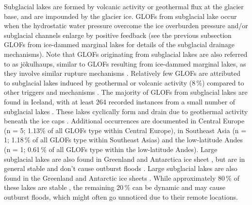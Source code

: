 Subglacial lakes are formed by volcanic activity or geothermal flux at the glacier base, and are impounded by the glacier ice. GLOFs from subglacial lake occur when the hydrostatic water pressure overcome the ice overburden pressure and/or subglacial channels enlarge by positive feedback (see the previous subsection GLOFs from ice-dammed marginal lakes for details of the subglacial drainage mechanisms). Note that GLOFs originating from subglacial lakes are also referred to as jökulhaups, similar to GLOFs resulting from ice-dammed marginal lakes, as they involve similar rupture mechanisms \citep{Bjornsson2010}. Relatively few GLOFs are attributed to subglacial lakes induced by geothermal or volcanic activity (8\,\%) compared to other triggers and mechanisms \citep{Lutzow&al2023}. The majority of GLOFs from subglacial lakes are found in Iceland, with at least 264 recorded instances from a small number of subglacial lakes \citep{Bjornsson2003}. These lakes cyclically form and drain due to geothermal activity beneath the ice caps \citep{Bjornsson&al2001}. Additional occurrences are documented in Central Europe (n = 5; 1.13\% of all GLOFs type within Central Europe), in
Southeast Asia (n = 1; 1.18\,\% of all GLOFs type within Southeast Asias) and the low-latitude Andes (n = 1; 0.61\,\% of all GLOFs type within the low-latitude Andes). Large subglacial lakes are also found in Greenland and Antarctica ice sheet \citep{Livingstone&al2022}, but are in general stable and don't cause outburst floods \citep{Siegert&al2016,Bowling&al2019}. Large subglacial lakes are also found in the Greenland and Antarctic ice sheets \citep{Siegert&al2016, Bowling&al2019}. While approximately 80\,\% of these lakes are stable \citep{Livingstone&al2022}, the remaining 20\,\% can be dynamic and may cause outburst floods, which might often go unnoticed due to their remote locations.



